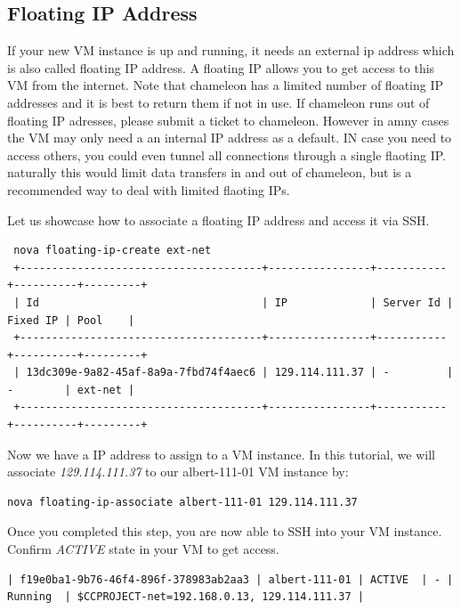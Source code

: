 \subsection{Floating IP Address}

If your new VM instance is up and running, it needs an external ip
address which is also called floating IP address. A floating IP allows
you to get access to this VM from the internet. Note that chameleon
has a limited number of floating IP addresses and it is best to return
them if not in use. If chameleon runs out of floating IP adresses,
please submit a ticket to chameleon.
However in amny cases the VM may only need a an internal IP address as a
default. IN case you need to access others, you could even tunnel all
connections through a single flaoting IP. naturally this would limit
data transfers in and out of chameleon, but is a recommended way to
deal with limited flaoting IPs.

Let us showcase how to associate a floating IP address and access it
via SSH.

\begin{tiny}
\begin{lstlisting}
 nova floating-ip-create ext-net
 +--------------------------------------+----------------+-----------+----------+---------+
 | Id                                   | IP             | Server Id | Fixed IP | Pool    |
 +--------------------------------------+----------------+-----------+----------+---------+
 | 13dc309e-9a82-45af-8a9a-7fbd74f4aec6 | 129.114.111.37 | -         | -        | ext-net |
 +--------------------------------------+----------------+-----------+----------+---------+
\end{lstlisting}
\end{tiny}

Now we have a IP address to assign to a VM instance. In this tutorial,
we will associate \textit{129.114.111.37} to our
albert-111-01 VM instance by:

\begin{lstlisting}
nova floating-ip-associate albert-111-01 129.114.111.37
\end{lstlisting}

Once you completed this step, you are now able to SSH into your VM
instance.  Confirm \textit{ACTIVE} state in your VM to get access.

\begin{tiny}
\begin{lstlisting}
| f19e0ba1-9b76-46f4-896f-378983ab2aa3 | albert-111-01 | ACTIVE  | - | Running  | $CCPROJECT-net=192.168.0.13, 129.114.111.37 |
\end{lstlisting}
\end{tiny}

